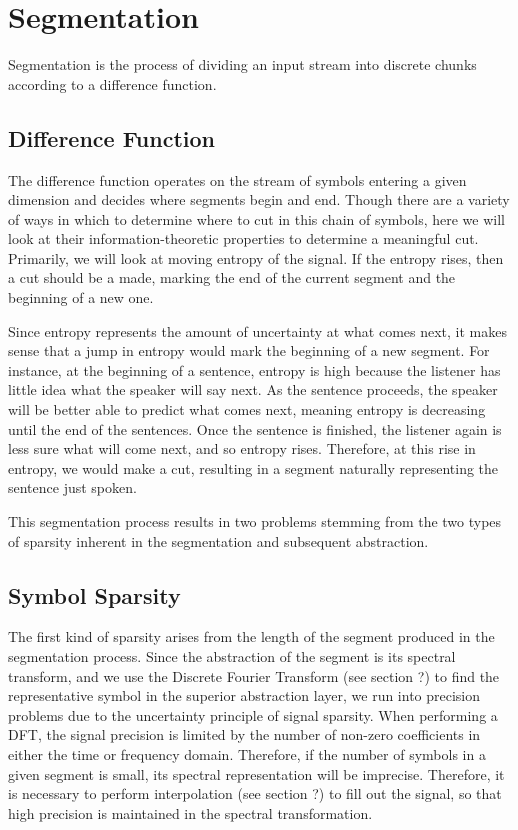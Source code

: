 \section{Segmentation}

Segmentation is the process of dividing an input stream into discrete chunks according to a difference function.

\subsection{Difference Function}
The difference function operates on the stream of symbols entering a given dimension and decides where segments begin and end.  Though there are a variety of ways in which to determine where to cut in this chain of symbols, here we will look at their information-theoretic properties to determine a meaningful cut. Primarily, we will look at moving entropy of the signal.  If the entropy rises, then a cut should be a made, marking the end of the current segment and the beginning of a new one.

Since entropy represents the amount of uncertainty at what comes next, it makes sense that a jump in entropy would mark the beginning of a new segment.  For instance, at the beginning of a sentence, entropy is high because the listener has little idea what the speaker will say next. As the sentence proceeds, the speaker will be better able to predict what comes next, meaning entropy is decreasing until the end of the sentences.  Once the sentence is finished, the listener again is less sure what will come next, and so entropy rises.  Therefore, at this rise in entropy, we would make a cut, resulting in a segment naturally representing the sentence just spoken.

This segmentation process results in two problems stemming from the two types of sparsity inherent in the segmentation and subsequent abstraction.

\subsection{Symbol Sparsity}
The first kind of sparsity arises from the length of the segment produced in the segmentation process.  Since the abstraction of the segment is its spectral transform, and we use the Discrete Fourier Transform (see section ?) to find the representative symbol in the superior abstraction layer, we run into precision problems due to the uncertainty principle of signal sparsity.  When performing a DFT, the signal precision is limited by the number of non-zero coefficients in either the time or frequency domain.  Therefore, if the number of symbols in a given segment is small, its spectral representation will be imprecise.  Therefore, it is necessary to perform interpolation (see section ?) to fill out the signal, so that high precision is maintained in the spectral transformation.

